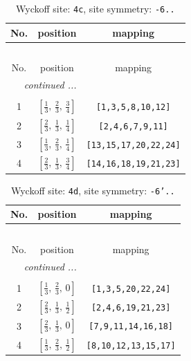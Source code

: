 \documentclass[fleqn,8pt]{jsarticle}
\begin{document}
\renewcommand{\arraystretch}{1.2}
\begin{longtable}{ccc}
\caption{Wyckoff site: {\tt 4c}, site symmetry: {\tt -6..}}
 \\
 \hline \hline
No. & position & mapping \\ \hline \endfirsthead

\multicolumn{2}{l}{\tablename\ \thetable{}} \\
 \hline \hline
No. & position & mapping \\ \hline \endhead

 \hline \hline
\multicolumn{2}{r}{\footnotesize\it continued ...} \\ \endfoot

 \hline \hline
\multicolumn{2}{r}{} \\ \endlastfoot

1 & $\left[ \frac{1}{3},\, \frac{2}{3},\, \frac{3}{4} \right]$ & {\tt [1,3,5,8,10,12]} \\ \hline
2 & $\left[ \frac{2}{3},\, \frac{1}{3},\, \frac{1}{4} \right]$ & {\tt [2,4,6,7,9,11]} \\ \hline
3 & $\left[ \frac{1}{3},\, \frac{2}{3},\, \frac{1}{4} \right]$ & {\tt [13,15,17,20,22,24]} \\ \hline
4 & $\left[ \frac{2}{3},\, \frac{1}{3},\, \frac{3}{4} \right]$ & {\tt [14,16,18,19,21,23]} \\
\end{longtable}
\renewcommand{\arraystretch}{1.2}
\begin{longtable}{ccc}
\caption{Wyckoff site: {\tt 4d}, site symmetry: {\tt -6'..}}
 \\
 \hline \hline
No. & position & mapping \\ \hline \endfirsthead

\multicolumn{2}{l}{\tablename\ \thetable{}} \\
 \hline \hline
No. & position & mapping \\ \hline \endhead

 \hline \hline
\multicolumn{2}{r}{\footnotesize\it continued ...} \\ \endfoot

 \hline \hline
\multicolumn{2}{r}{} \\ \endlastfoot

1 & $\left[ \frac{1}{3},\, \frac{2}{3},\, 0 \right]$ & {\tt [1,3,5,20,22,24]} \\ \hline
2 & $\left[ \frac{2}{3},\, \frac{1}{3},\, \frac{1}{2} \right]$ & {\tt [2,4,6,19,21,23]} \\ \hline
3 & $\left[ \frac{2}{3},\, \frac{1}{3},\, 0 \right]$ & {\tt [7,9,11,14,16,18]} \\ \hline
4 & $\left[ \frac{1}{3},\, \frac{2}{3},\, \frac{1}{2} \right]$ & {\tt [8,10,12,13,15,17]} \\
\end{longtable}
\end{document}
